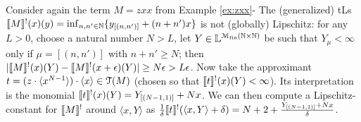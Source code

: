 \begin{example}
Consider again the term $M=zxx$ from Example \ref{ex:zxx}-
%
 The (generalized) tLs $\llbracket M\rrbracket^{!}(x)(y)= \inf_{n,n'\in \mathbb N}\{y_{[(n,n')]}+(n+n')x\}$ is not (globally) Lipschitz: for any 
$L>0$, choose a natural number $N>L$, let $Y\in \mathbb{L}^{\mathcal M_{\mathrm{fin}}(\mathbb N\times \mathbb N)}$ be such that $Y_{\mu}<\infty$ only if $\mu=[(n,n')]$ with $n+n'\geq N$; then $|\llbracket M\rrbracket^{!}(x)(Y)- \llbracket M\rrbracket^{!}(x+\epsilon)(Y)|\geq N\epsilon > L\epsilon$. 
Now take the approximant $t= (z\cdot \langle x^{N-1}\rangle) \cdot \langle x\rangle \in \mathcal{T}(M)$ (chosen so that $\llbracket t\rrbracket^{!}(x)(Y)<\infty$). Its interpretation is the monomial 
$\llbracket t\rrbracket^{!}(x)(Y) = Y_{[(N-1,1)]}+Nx$. We can then compute a Lipschitz-constant for $\llbracket M\rrbracket^{!}$ around $\langle x,Y\rangle$
as $\frac{1}{\delta}\llbracket t\rrbracket^{!}(\langle x,Y\rangle+\delta)= N+2 + \frac{Y_{[(N-1,1)]}+Nx}{\delta}$. 
\end{example}
%    
%
%

